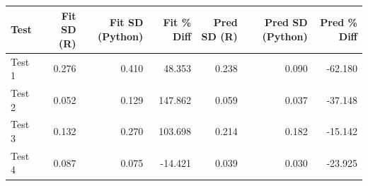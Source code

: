 
\begin{tabular}{l|r|r|r|r|r|r}
\hline
Test & Fit SD (R) & Fit SD (Python) & Fit \% Diff & Pred SD (R) & Pred SD (Python) & Pred \% Diff\\
\hline
Test 1 & 0.276 & 0.410 & 48.353 & 0.238 & 0.090 & -62.180\\
\hline
Test 2 & 0.052 & 0.129 & 147.862 & 0.059 & 0.037 & -37.148\\
\hline
Test 3 & 0.132 & 0.270 & 103.698 & 0.214 & 0.182 & -15.142\\
\hline
Test 4 & 0.087 & 0.075 & -14.421 & 0.039 & 0.030 & -23.925\\
\hline
\end{tabular}
